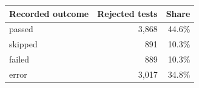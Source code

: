   \renewcommand{\theHreporttablerow}{rq6_non_passing_outcomes.\arabic{reporttablerow}}
  \setcounter{reporttablerow}{0}
  \begin{tabular}{lrr}
  \toprule
  Recorded outcome & Rejected tests & Share \\
  \midrule
  {reporttablerow}\label{tabrow:rq6_non_passing_outcomes:passed}passed & 3,868 & 44.6\% \\
  {reporttablerow}\label{tabrow:rq6_non_passing_outcomes:skipped}skipped & 891 & 10.3\% \\
  {reporttablerow}\label{tabrow:rq6_non_passing_outcomes:failed}failed & 889 & 10.3\% \\
  {reporttablerow}\label{tabrow:rq6_non_passing_outcomes:error}error & 3,017 & 34.8\% \\
  \bottomrule
  \end{tabular}
